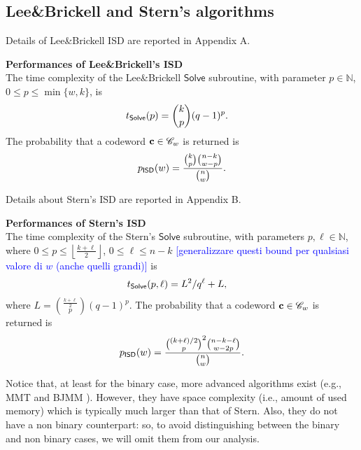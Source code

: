\subsection{Lee\&Brickell and Stern's algorithms}

Details of Lee\&Brickell ISD are reported in Appendix A.
\begin{proposition}\textbf{Performances of Lee\&Brickell's ISD}\\
The time complexity of the Lee\&Brickell $\mathsf{Solve}$ subroutine, with parameter $p\in\mathbb N$, $0\leq p \leq \min\{w , k\}$, is
\begin{align*}
t_{\sf{Solve}}(p) &\nonumber = \binom{k}{p}(q-1)^p.
\end{align*}
The probability that a codeword $\mathbf c\in \mathscr C_w$ is returned is
\begin{equation*}
p_{\sf{ISD}}(w) = \frac{\binom{k}{p}\binom{n-k}{w-p}}{\binom{n}{w}}.
\end{equation*}
\end{proposition}

Details about Stern's ISD are reported in Appendix B.
\begin{proposition}\textbf{Performances of Stern's ISD}\\
The time complexity of the Stern's $\mathsf{Solve}$ subroutine, with parameters $p,\ell\in\mathbb N$, where $0\leq p\leq \left\lfloor\frac{k+\ell}{2}\right\rfloor$, $0\leq \ell \leq n-k$ \textcolor{blue}{[generalizzare questi bound per qualsiasi valore di $w$ (anche quelli grandi)]} is \begin{align*}
t_{\sf{Solve}}(p,\ell) &\nonumber = L^2/q^{\ell}+L,
\end{align*}
where $L = \binom{\frac{k+\ell}{2}}{p}(q-1)^p$.
The probability that a codeword $\mathbf c\in\mathscr C_w$ is returned is 
\begin{equation}
p_{\sf{ISD}}(w) = \frac{\binom{(k+\ell)/2}{p}^2 \binom{n-k-\ell}{w-2p}}{\binom{n}{w}}.
    \label{eq:probRound}
    \end{equation}
\end{proposition}

Notice that, at least for the binary case, more advanced algorithms exist (e.g., MMT \cite{may2011decoding} and BJMM \cite{becker2012decoding}).
However, they have space complexity (i.e., amount of used memory) which is typically much larger than that of Stern.
Also, they do not have a non binary counterpart: so, to avoid distinguishing between the binary and non binary cases, we will omit them from our analysis.